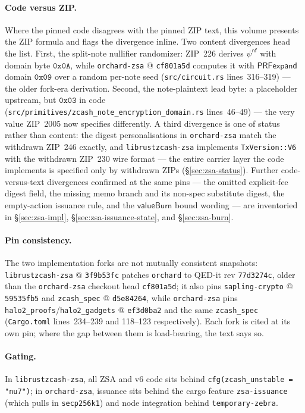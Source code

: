 \documentclass[11pt,a4paper]{article}
\theoremstyle{definition}
\newcommand{\nfsym}{\mathsf{nf}}
\begin{document}
\paragraph{Code versus ZIP.} Where the pinned code disagrees with the pinned
ZIP text, this volume presents the ZIP formula and flags the divergence
inline. Two content divergences head the list. First, the split-note nullifier
randomizer: ZIP~226 derives $\psi^{\nfsym}$ with domain byte $\mathtt{0x0A}$,
while \texttt{orchard-zsa} @ \texttt{cf801a5d} computes it with
$\mathsf{PRFexpand}$ domain $\mathtt{0x09}$ over a random per-note seed
(\texttt{src/circuit.rs} lines~316--319) --- the older fork-era derivation.
Second, the note-plaintext lead byte: a placeholder upstream, but
$\mathtt{0x03}$ in code
(\texttt{src/primitives/zcash\_note\_encryption\_domain.rs} lines~46--49) ---
the very value ZIP~2005 now specifies differently. A third divergence is one
of status rather than content: the digest personalisations in
\texttt{orchard-zsa} match the withdrawn ZIP~246 exactly, and
\texttt{librustzcash-zsa} implements \texttt{TxVersion::V6} with the withdrawn
ZIP~230 wire format --- the entire carrier layer the code implements is
specified only by withdrawn ZIPs (\S\ref{sec:zsa-status}). Further
code-versus-text divergences confirmed at the same pins --- the omitted
explicit-fee digest field, the missing memo branch and its non-spec
substitute digest, the empty-action issuance rule, and the
$\mathsf{valueBurn}$ bound wording --- are inventoried in
\S\ref{sec:zsa-impl}, \S\ref{sec:zsa-issuance-state}, and
\S\ref{sec:zsa-burn}.

\paragraph{Pin consistency.} The two implementation forks are not mutually
consistent snapshots: \texttt{librustzcash-zsa} @ \texttt{3f9b53fc} patches
\texttt{orchard} to QED-it rev \texttt{77d3274c}, older than the
\texttt{orchard-zsa} checkout head \texttt{cf801a5d}; it also pins
\texttt{sapling-crypto} @ \texttt{59535fb5} and \texttt{zcash\_spec} @
\texttt{d5e84264}, while \texttt{orchard-zsa} pins
\texttt{halo2\_proofs}/\texttt{halo2\_gadgets} @ \texttt{ef3d0ba2} and the
same \texttt{zcash\_spec} (\texttt{Cargo.toml} lines~234--239 and 118--123
respectively). Each fork is cited at its own pin; where the gap between them
is load-bearing, the text says so.

\paragraph{Gating.} In \texttt{librustzcash-zsa}, all ZSA and v6 code sits
behind \texttt{cfg(zcash\_unstable = "nu7")}; in \texttt{orchard-zsa},
issuance sits behind the cargo feature \texttt{zsa-issuance} (which pulls in
\texttt{secp256k1}) and node integration behind \texttt{temporary-zebra}.
\end{document}
